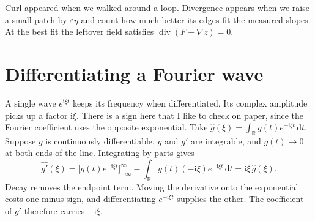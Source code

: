 \documentclass[11pt,a4paper]{article}
\numberwithin{equation}{section}
\newcommand{\ii}{\mathrm{i}}
\DeclareMathOperator{\Div}{div}
\begin{document}
Curl appeared when we walked around a loop. Divergence appears when we
raise a small patch by $\varepsilon\eta$ and count how much better its
edges fit the measured slopes. At the best fit the leftover field satisfies
$\Div(F-\nabla z)=0$.

\newpage
\section{Differentiating a Fourier wave}

A single wave $e^{\ii\xi t}$ keeps its frequency when differentiated.
Its complex amplitude picks up a factor $\ii\xi$. There is a sign here
that I like to check on paper, since the Fourier coefficient uses the
opposite exponential. Take
$\widehat g(\xi)=\int_{\mathbb R}g(t)e^{-\mathrm i\xi t}\,\mathrm dt$.
Suppose $g$ is continuously differentiable, $g$ and $g'$ are integrable,
and $g(t)\to0$ at both ends of the line. Integrating by parts gives
\begin{equation}
  \widehat{g'}(\xi)
  =\bigl[g(t)e^{-\mathrm i\xi t}\bigr]_{-\infty}^{\infty}
     -\int_{\mathbb R}g(t)(-\mathrm i\xi)e^{-\mathrm i\xi t}\,\mathrm dt
  =\mathrm i\xi\,\widehat g(\xi).
\end{equation}
Decay removes the endpoint term. Moving the derivative onto the exponential
costs one minus sign, and differentiating $e^{-\ii\xi t}$ supplies the
other. The coefficient of $g'$ therefore carries $+\ii\xi$.
\end{document}
